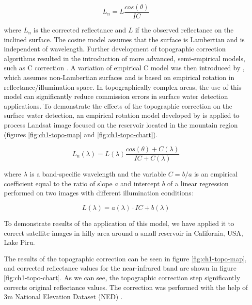 \begin{equation}
\label{eq:cosine}
L_n = L \frac{cos(\theta)}{IC}
\end{equation}

where $L_n$ is the corrected reflectance and $L$ if the observed reflectance on the inclined surface. The cosine model assumes that the surface is Lambertian and is independent of wavelength. Further development of topographic correction algorithms resulted in the introduction of more advanced, semi-empirical models, such as C correction \citep{teillet1982slope}. A variation of empirical C model was then introduced by \citep{tan2013improved}, which assumes non-Lambertian surfaces and is based on empirical rotation in reflectance/illumination space. In topographically complex areas, the use of this model can significantly reduce commission errors in surface water detection applications. To demonstrate the effects of the topographic correction on the surface water detection, an empirical rotation model developed by \citep{tan2013improved} is applied to process Landsat image focused on the reservoir located in the mountain region (figures \ref{fig:ch1-topo-map} and \ref{fig:ch1-topo-chart}). 

\begin{equation}
\label{eq:topo-c}
L_n(\lambda) = L(\lambda) \frac{cos(\theta) + C(\lambda)}{IC + C(\lambda)}
\end{equation}

where ${\lambda}$ is a band-specific wavelength and the variable $C = b / a$ is an empirical coefficient equal to the ratio of slope $a$ and intercept $b$ of a linear regression performed on two images with different illumination conditions:

\begin{equation}
\label{eq:topo-c-regression}
L(\lambda) = a(\lambda) \cdot IC + b(\lambda)
\end{equation}

To demonstrate results of the application of this model, we have applied it to correct satellite images in hilly area around a small reservoir in California, USA, Lake Piru.

The results of the topographic correction can be seen in figure \ref{fig:ch1-topo-map}, and corrected reflectance values for the near-infrared band are shown in figure \ref{fig:ch1-topo-chart}. As we can see, the topographic correction step significantly corrects original reflectance values. The correction was performed with the help of 3m National Elevation Dataset (NED) \cite{gesch2002national}.

